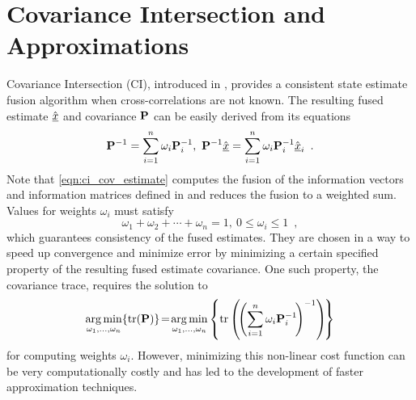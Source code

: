 \documentclass[letterpaper, 10 pt, conference]{ieeeconf}  %
\begin{document}



\section{Covariance Intersection and Approximations} \label{sec:ci}
Covariance Intersection (CI), introduced in \cite{julierNondivergentEstimationAlgorithm1997}, provides a consistent state estimate fusion algorithm when cross-correlations are not known. The resulting fused estimate $\hat{{\underline{x}}}$ and covariance ${{\mathbf{P}}}$ can be easily derived from its equations
\begin{equation}
   {\ensuremath{{\mathbf{P}}}}^{-1}=\sum_{i=1}^{n}\omega_i {{\mathbf{P}}}_i^{-1},\ {{\mathbf{P}}}^{-1} \hat{{\underline{x}}} =\sum_{i=1}^{n}\omega_i {{\mathbf{P}}}_i^{-1} \hat{{\underline{x}}}_i\enspace. \label{eqn:ci_cov_estimate}
\end{equation}
Note that \eqref{eqn:ci_cov_estimate} computes the fusion of the information vectors and information matrices defined in \cite{niehsenInformationFusionBased2002} and reduces the fusion to a weighted sum. Values for weights $\omega_i$ must satisfy
\begin{equation}
   \omega_1 + \omega_2 + \cdots + \omega_n = 1,\ 0 \leq \omega_i \leq 1\enspace, \label{eqn:ci_omega_sum_bound}
\end{equation}
which guarantees consistency of the fused estimates. They are chosen in a way to speed up convergence and minimize error by minimizing a certain specified property of the resulting fused estimate covariance. One such property, the covariance trace, requires the solution to
\begin{equation}
   \operatorname*{arg\,min}_{\omega_1,\dots,\omega_n} \{\operatorname{tr}({{\mathbf{P}}})\}\! =\! \operatorname*{arg\,min}_{\omega_1,\dots,\omega_n} \left\{\operatorname{tr}\left(\!\left(\sum_{i=1}^{n}\omega_i {{\mathbf{P}}}_i^{-1}\!\right)^{-1}\right)\!\right\} \label{eqn:ci_trace_min}
\end{equation}
for computing weights $\omega_i$. However, minimizing this non-linear cost function can be very computationally costly and has led to the development of faster approximation techniques.
\end{document}

